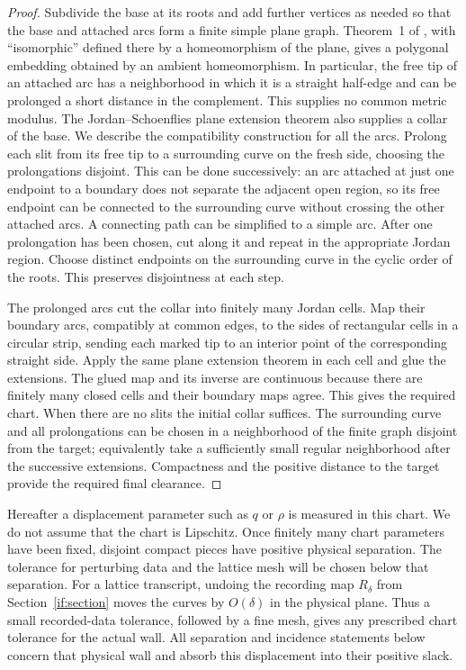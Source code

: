 \documentclass[11pt]{article}
\theoremstyle{definition}
\theoremstyle{remark}
\numberwithin{equation}{section}
\begin{document}
\begin{proof}
Subdivide the base at its roots and add further vertices as needed
so that the base and attached arcs form a finite simple plane graph.
Theorem~1 of \cite{Schaefer2021}, with ``isomorphic'' defined there
by a homeomorphism of the plane, gives a polygonal embedding obtained
by an ambient homeomorphism.  In particular, the free tip of an attached
arc has a neighborhood in which it is a straight half-edge and can
be prolonged a short distance in the complement.  This supplies no
common metric modulus.  The Jordan--Schoenflies plane extension
theorem \cite[Section~10, Theorem~4]{Moise1977} also supplies a collar of the
base.  We describe the compatibility construction for all the arcs.
Prolong each slit from
its free tip to a surrounding curve on the fresh side, choosing the
prolongations disjoint.  This can be done successively: an arc attached
at just one endpoint to a boundary does not separate the adjacent open
region, so its free endpoint can be connected to the surrounding curve
without crossing the other attached arcs.  A connecting path can be
simplified to a simple arc.  After one prolongation has been chosen,
cut along it and repeat in the appropriate Jordan region.  Choose
distinct endpoints on the surrounding curve in the cyclic order of
the roots.  This preserves disjointness at each step.

The prolonged arcs cut the collar into finitely many Jordan cells.
Map their boundary arcs, compatibly at common edges, to the sides of
rectangular cells in a circular strip, sending each marked tip to an
interior point of the corresponding straight side.  Apply the same
plane extension theorem in each cell and glue the extensions.
The glued map and its inverse are continuous because there are
finitely many closed cells and their boundary maps agree.  This gives
the required chart.  When there are no slits the initial collar
suffices.  The surrounding curve and all prolongations can be chosen
in a neighborhood of the finite graph disjoint from the target;
equivalently take a sufficiently small regular neighborhood after
the successive extensions.  Compactness and the positive distance
to the target provide the required final clearance.
\end{proof}

Hereafter a displacement parameter such as $q$ or $\rho$ is measured in
this chart.  We do not assume that the chart is Lipschitz.  Once finitely
many chart parameters have been fixed, disjoint compact pieces have
positive physical separation.  The tolerance for perturbing data and
the lattice mesh will be chosen below that separation. For a lattice
transcript, undoing the recording map $R_\delta$ from
Section~\ref{if:section} moves the curves by $O(\delta)$ in the
physical plane. Thus a small recorded-data tolerance, followed by a
fine mesh, gives any prescribed chart tolerance for the actual wall.
All separation and incidence statements below concern that physical
wall and absorb this displacement into their positive slack.
\end{document}
